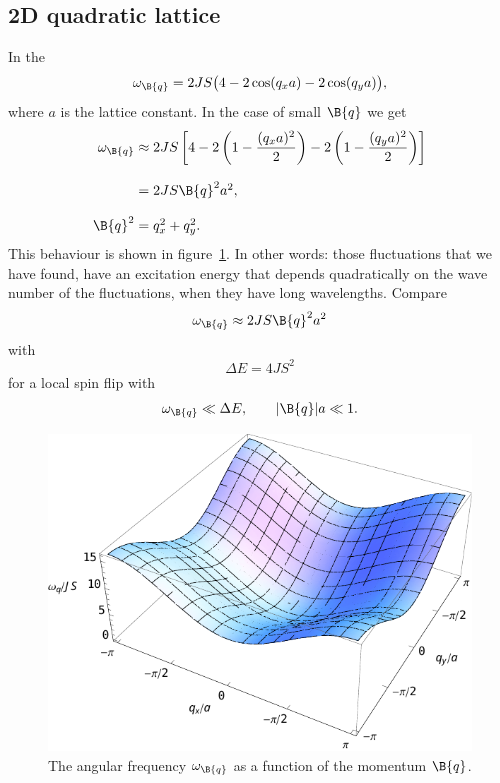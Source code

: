 \subsection{2D quadratic lattice}
In the 
\[\omega_{\B{q}}=2JS\big(4-2\cos(q_xa)-2\cos(q_ya)\big),\]
where $a$ is the lattice constant. In the case of small $\B{q}$ we get
\[\begin{array}{r@{\;}c@{\;}l}
	\omega_{\B{q}}	& \approx	& 2JS\left[4-2\left(1-\dfrac{(q_xa)^2}{2}\right)-2\left(1-\dfrac{(q_ya)^2}{2}\right)\right]\\\\
					& =			& 2JS\B{q}^2a^2,\\\\
	\B{q}^2			& =			& q_x^2+q_y^2.
\end{array}\]
This behaviour is shown in figure~\ref{fig:omega_quadratic}. In other words: those fluctuations that we have found, have an excitation energy that depends quadratically on the wave number of the fluctuations, when they have long wavelengths. Compare
\[\omega_{\B{q}}\approx2JS\B{q}^2a^2\]
with
\[\Delta E=4JS^2\]
for a local spin flip with
\[\omega_{\B{q}}\ll\Delta E,\qquad |\B{q}|a\ll 1.\]

\begin{figure}
	\centering
	\includegraphics{img/omega_quadratic.pdf}
	\caption{\label{fig:omega_quadratic}The angular frequency $\omega_{\B{q}}$ as a function of the momentum $\B{q}$.}
\end{figure}

